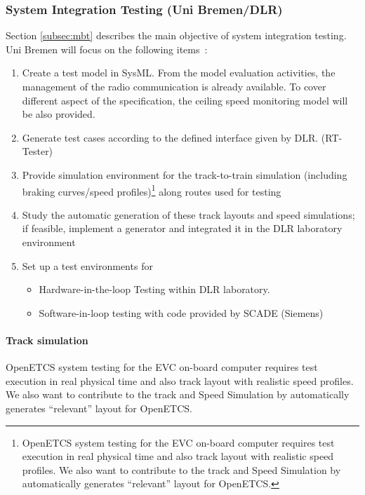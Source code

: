 \documentclass{template/openetcs_report}
\begin{document}
\subsubsection{System Integration  Testing (Uni Bremen/DLR)}
Section \ref{subsec:mbt} describes the main objective of system
integration testing. Uni Bremen will focus on the following items~:
\begin{enumerate}
\item Create a test model in SysML. From the model evaluation
  activities, the management of the radio communication is already
  available. To cover different aspect of the specification, the
  ceiling speed monitoring model will be also provided.
\item Generate test cases according to the defined interface given by
  DLR. (RT-Tester) 
\item Provide simulation environment for the
  track-to-train simulation (including braking curves/speed
  profiles)\footnote{ OpenETCS system testing for the EVC on-board
    computer requires test execution in real physical time and also
    track layout with realistic speed profiles.  We also want to
    contribute to the track and Speed Simulation by automatically
    generates ``relevant'' layout for OpenETCS.}  along routes used
  for testing
\item Study the automatic generation of these track layouts and speed
  simulations; if feasible, implement a generator and integrated it in
  the DLR laboratory environment
\item Set up a test environments for
  \begin{itemize}  
  \item Hardware-in-the-loop Testing within DLR laboratory.
  \item Software-in-loop testing with code provided by SCADE (Siemens)
  \end{itemize}
\end{enumerate}


\paragraph{Track simulation}
OpenETCS system testing for the EVC on-board computer requires test
execution in real physical time and also track layout with realistic
speed profiles.  We also want to contribute to the track and Speed
Simulation by automatically generates ``relevant'' layout for OpenETCS.
\end{document}
